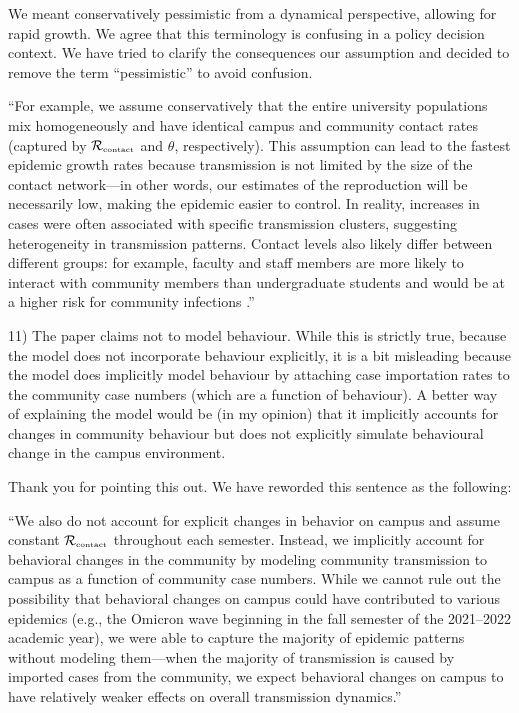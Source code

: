 \documentclass[12pt]{article}
\newcommand{\Rx}[1]{\ensuremath{{\mathcal R}_{#1}}}
\newcommand{\Rc}{\Rx{\textrm{\tiny{contact}}}}
\newcommand{\revtext}{\textsf}
\begin{document}
We meant conservatively pessimistic from a dynamical perspective, allowing for rapid growth.
We agree that this terminology is confusing in a policy decision context. 
We have tried to clarify the consequences our assumption and decided to remove the term ``pessimistic'' to avoid confusion.

``For example, we assume conservatively that the entire university populations mix homogeneously and have identical campus and community contact rates (captured by $\Rc$ and $\theta$, respectively).
This assumption can lead to the fastest epidemic growth rates because transmission is not limited by the size of the contact network---in other words, our estimates of the reproduction will be necessarily low, making the epidemic easier to control.
In reality, increases in cases were often associated with specific transmission clusters, suggesting heterogeneity in transmission patterns.
Contact levels also likely differ between different groups:
for example, faculty and staff members are more likely to interact with community members than undergraduate students and would be at a higher risk for community infections \citep{frazier2022modeling}.''

\revtext{11) The paper claims not to model behaviour. While this is strictly true, because the model does not incorporate behaviour explicitly, it is a bit misleading because the model does implicitly model behaviour by attaching case importation rates to the community case numbers (which are a function of behaviour). A better way of explaining the model would be (in my opinion) that it implicitly accounts for changes in community behaviour but does not explicitly simulate behavioural change in the campus environment.}

Thank you for pointing this out. We have reworded this sentence as the following:

``We also do not account for explicit changes in behavior on campus and assume constant $\Rc$ throughout each semester.
Instead, we implicitly account for behavioral changes in the community by modeling community transmission to campus as a function of community case numbers.
While we cannot rule out the possibility that behavioral changes on campus could have contributed to various epidemics (e.g., the Omicron wave beginning in the fall semester of the 2021--2022 academic year), we were able to capture the majority of epidemic patterns without modeling them---when the majority of transmission is caused by imported cases from the community, we expect behavioral changes on campus to have relatively weaker effects on overall transmission dynamics.''
\end{document}
